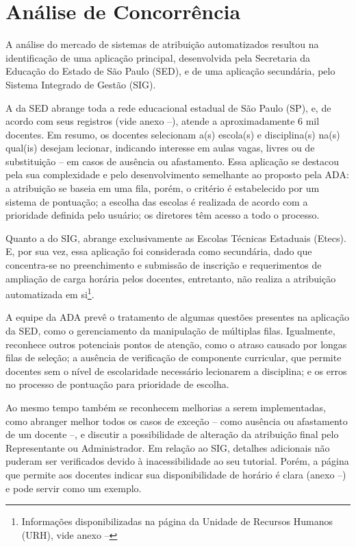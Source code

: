 \documentclass[12pt]{article}
\begin{document}
\section{Análise de Concorrência}
\par A análise do mercado de sistemas de atribuição automatizados resultou na identificação de uma aplicação principal, desenvolvida pela Secretaria da Educação do Estado de São Paulo (SED), e de uma aplicação secundária, pelo Sistema Integrado de Gestão (SIG).
\par A da SED abrange toda a rede educacional estadual de São Paulo (SP), e, de acordo com seus registros (vide anexo --), atende a aproximadamente 6 mil docentes. Em resumo, os docentes selecionam a(s) escola(s) e disciplina(s) na(s) qual(is) desejam lecionar, indicando interesse em aulas vagas, livres ou de substituição – em casos de ausência ou afastamento. Essa aplicação se destacou pela sua complexidade e pelo desenvolvimento semelhante ao proposto pela ADA: a atribuição se baseia em uma fila, porém, o critério é estabelecido por um sistema de pontuação; a escolha das escolas é realizada de acordo com a prioridade definida pelo usuário; os diretores têm acesso a todo o processo.
\par Quanto a do SIG, abrange exclusivamente as Escolas Técnicas Estaduais (Etecs). E, por sua vez, essa aplicação foi considerada como secundária, dado que concentra-se no preenchimento e submissão de inscrição e requerimentos de ampliação de carga horária pelos docentes, entretanto, não realiza a atribuição automatizada em si\footnote{Informações disponibilizadas na página da Unidade de Recursos Humanos (URH), vide anexo --}.
\par A equipe da ADA prevê o tratamento de algumas questões presentes na aplicação da SED, como o gerenciamento da manipulação de múltiplas filas. Igualmente, reconhece outros potenciais pontos de atenção, como o atraso causado por longas filas de seleção; a ausência de verificação de componente curricular, que permite docentes sem o nível de escolaridade necessário lecionarem a disciplina; e os erros no processo de pontuação para prioridade de escolha. \cite{g1_2020} \cite{acioli_2021}
\par Ao mesmo tempo também se reconhecem melhorias a serem implementadas, como abranger melhor todos os casos de exceção – como ausência ou afastamento de um docente –, e discutir a possibilidade de alteração da atribuição final pelo Representante ou Administrador. Em relação ao SIG, detalhes adicionais não puderam ser verificados devido à inacessibilidade ao seu tutorial. Porém, a página que permite aos docentes indicar sua disponibilidade de horário é clara (anexo --) e pode servir como um exemplo.
\end{document}
